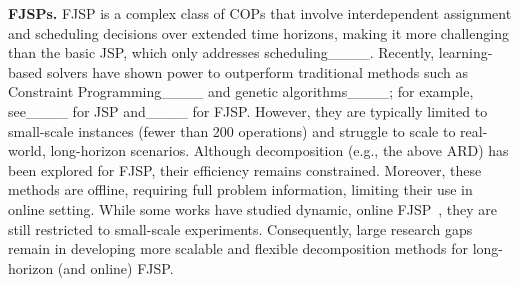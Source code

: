 \textbf{FJSPs.} 
FJSP is a complex class of COPs that involve interdependent assignment and scheduling decisions over extended time horizons, making it more challenging than the basic JSP, which only addresses scheduling____. Recently, learning-based solvers have shown power to outperform traditional methods such as Constraint Programming____ and genetic algorithms____; for example, see____ for JSP and____ for FJSP. However, they are typically limited to small-scale instances (fewer than 200 operations) and struggle to scale to real-world, long-horizon scenarios. Although decomposition (e.g., the above ARD) has been explored for FJSP, their efficiency remains constrained. Moreover, these methods are offline, requiring full problem information, limiting their use in online setting. While some works have studied dynamic, online FJSP~\cite {luo2021real, lei2023large}, they are still restricted to small-scale experiments. Consequently, large research gaps remain in developing more scalable and flexible decomposition methods for long-horizon (and online) FJSP.